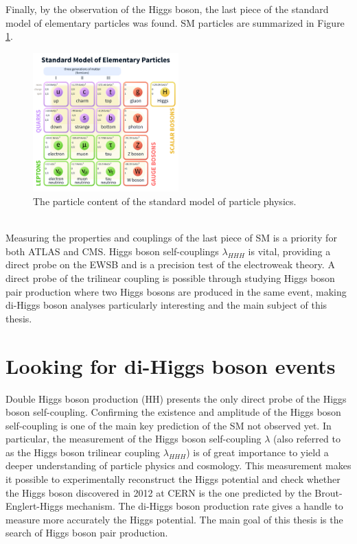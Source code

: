 Finally, by the observation of the Higgs boson, the last piece of the standard model of elementary particles was found. SM particles are summarized in Figure \ref{fig:chap1:H2012:SM}. 
\begin{figure}[htbp]
    \centering
    \includegraphics[width=0.5\textwidth]{Ch1/Img/SM_particles.png}
    \caption{The particle content of the standard model of particle physics.}
    \label{fig:chap1:H2012:SM}
\end{figure}
\\
Measuring the properties and couplings of the last piece of SM is a priority for both ATLAS and CMS. Higgs boson self-couplings $\lambda_{HHH}$ is vital, providing a direct probe on the EWSB and is a precision test of the electroweak theory. A direct probe of the trilinear coupling is possible through studying Higgs boson pair production where two Higgs bosons are produced in the same event, making di-Higgs boson analyses particularly interesting and the main subject of this thesis.
\clearpage
\section{Looking for di-Higgs boson events}
\label{chap1:HH}
Double Higgs boson production (HH) presents the only direct probe of the Higgs boson self-coupling. Confirming the existence and amplitude of the Higgs boson self-coupling is one of the main key prediction of the SM not observed yet. In particular, the measurement of the Higgs boson self-coupling $\lambda$ (also referred to as the Higgs boson trilinear coupling $\lambda_{HHH}$) is of great importance to yield a deeper understanding of particle physics and cosmology. This measurement makes it possible to experimentally reconstruct the Higgs potential and check whether the Higgs boson discovered in 2012 at CERN is the one predicted by the Brout-Englert-Higgs mechanism. The di-Higgs boson production rate gives a handle to measure more accurately the Higgs potential. The main goal of this thesis is the search of Higgs boson pair production.
